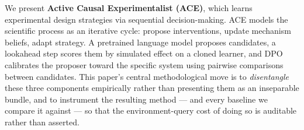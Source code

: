\documentclass{article}
\theoremstyle{plain}
\theoremstyle{definition}
\theoremstyle{remark}
\begin{document}
We present \textbf{Active Causal Experimentalist (ACE)}, which learns experimental design strategies via sequential decision-making. ACE models the scientific process as an iterative cycle: propose interventions, update mechanism beliefs, adapt strategy. A pretrained language model proposes candidates, a lookahead step scores them by simulated effect on a cloned learner, and DPO \citep{rafailov2023direct} calibrates the proposer toward the specific system using pairwise comparisons between candidates. This paper's central methodological move is to \emph{disentangle} these three components empirically rather than presenting them as an inseparable bundle, and to instrument the resulting method --- and every baseline we compare it against --- so that the environment-query cost of doing so is auditable rather than asserted.
\end{document}
